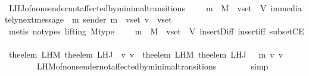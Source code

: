 \begin{isabellebody}
\ \ \ \ \ \ \isamarkupfalse%
\ L{\isacharunderscore}H{\isacharunderscore}J{\isacharunderscore}of{\isacharunderscore}non{\isacharunderscore}sender{\isacharunderscore}not{\isacharunderscore}affected{\isacharunderscore}by{\isacharunderscore}minimal{\isacharunderscore}transitions\ {\isacartoucheopen}{\isasymsigma}\ {\isasymin}\ {\isasymSigma}\ {\isasymand}\ m\ {\isasymin}\ M\ {\isasymand}\ v{\isacharunderscore}set\ {\isasymsubseteq}\ V{\isacartoucheclose}\ {\isacartoucheopen}immediately{\isacharunderscore}next{\isacharunderscore}message\ {\isacharparenleft}{\isasymsigma}{\isacharcomma}\ m{\isacharparenright}{\isacartoucheclose}\ {\isacartoucheopen}sender\ m\ {\isasymnotin}\ v{\isacharunderscore}set{\isacartoucheclose}\ {\isacartoucheopen}v\ {\isasymin}\ v{\isacharunderscore}set{\isacartoucheclose}\isanewline
\ \ \ \ \ \ \isamarkupfalse%
\ {\isacharparenleft}metis\ {\isacharparenleft}no{\isacharunderscore}types{\isacharcomma}\ lifting{\isacharparenright}\ M{\isacharunderscore}type\ {\isacartoucheopen}{\isasymsigma}\ {\isasymin}\ {\isasymSigma}\ {\isasymand}\ m\ {\isasymin}\ M\ {\isasymand}\ v{\isacharunderscore}set\ {\isasymsubseteq}\ V{\isacartoucheclose}\ insert{\isacharunderscore}Diff\ insert{\isacharunderscore}iff\ subsetCE{\isacharparenright}\ \ \ \ \ \ \ \isanewline
\ \ \ \ \isamarkupfalse%
\ \isamarkupfalse%
\ \isamarkupfalse%
\ {\isachardoublequoteopen}the{\isacharunderscore}elem\ {\isacharparenleft}L{\isacharunderscore}H{\isacharunderscore}M\ {\isacharparenleft}the{\isacharunderscore}elem\ {\isacharparenleft}L{\isacharunderscore}H{\isacharunderscore}J\ {\isasymsigma}\ v{\isacharparenright}{\isacharparenright}\ v{\isacharprime}{\isacharparenright}\ {\isacharequal}\ the{\isacharunderscore}elem\ {\isacharparenleft}L{\isacharunderscore}H{\isacharunderscore}M\ {\isacharparenleft}the{\isacharunderscore}elem\ {\isacharparenleft}L{\isacharunderscore}H{\isacharunderscore}J\ {\isacharparenleft}{\isasymsigma}\ {\isasymunion}\ {\isacharbraceleft}m{\isacharbraceright}{\isacharparenright}\ v{\isacharparenright}{\isacharparenright}\ v{\isacharprime}{\isacharparenright}{\isachardoublequoteclose}\isanewline
\ \ \ \ \ \ \isamarkupfalse%
\ L{\isacharunderscore}H{\isacharunderscore}M{\isacharunderscore}of{\isacharunderscore}non{\isacharunderscore}sender{\isacharunderscore}not{\isacharunderscore}affected{\isacharunderscore}by{\isacharunderscore}minimal{\isacharunderscore}transitions\isanewline
\ \ \ \ \ \ \isamarkupfalse%
\ simp\ \isanewline
\ \ \ \ \isamarkupfalse%

\end{isabellebody}
